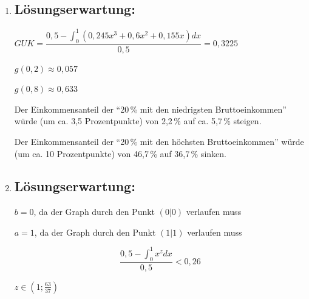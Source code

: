 \begin{langesbeispiel}
{\begin{enumerate}
	\textit{(Anmerkung: Bei "`besonderer"' Lage der Punkte kann auch ein Grad kleiner als fünf ausreichend sein.}\leer
	
	Jede Lorenz-Kurve verläuft durch den Punkt $(0|0)$. Da eine Exponentialfunktion $e$ mit $e(x)=a\cdot b^x$ $(a,b\in\mathbb{R}^+)$ nicht durch den Koordinatenursprung verläuft, ist sie nicht für die Modellierung geeignet.

\item \subsection{Lösungserwartung:}
	
$GUK=\dfrac{0,5-\int^1_0{(0,245x^3+0,6x^2+0,155x)dx}}{0,5}=0,3225$\leer

$g(0,2)\approx 0,057$

$g(0,8)\approx 0,633$\leer

Der Einkommensanteil der "`20\,\% mit den niedrigsten Bruttoeinkommen"' würde (um ca. 3,5 Prozentpunkte) von 2,2\,\% auf ca. 5,7\,\% steigen.\leer

Der Einkommensanteil der "`20\,\% mit den höchsten Bruttoeinkommen"' würde (um ca. 10 Prozentpunkte) von 46,7\,\% auf 36,7\,\% sinken.
\item \subsection{Lösungserwartung:}
	
$b=0$, da der Graph durch den Punkt $(0|0)$ verlaufen muss

$a=1$, da der Graph durch den Punkt $(1|1)$ verlaufen muss

$$\frac{0,5-\int^1_0{x^z}dx}{0,5}<0,26$$

$z\in\left(1;\frac{63}{37}\right)$

\end{enumerate}}
		\end{langesbeispiel}